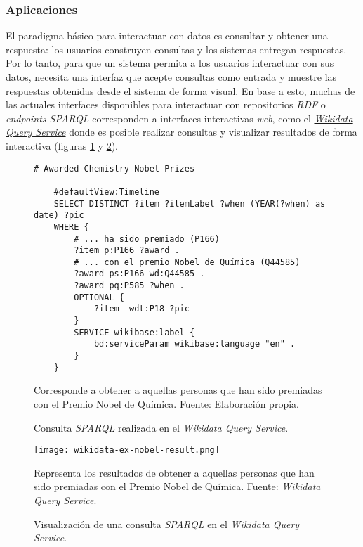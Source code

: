 \subsubsection{Aplicaciones}
\label{sec:aplicaciones}

El paradigma básico para interactuar con datos es consultar y obtener una respuesta: los usuarios construyen consultas y los sistemas entregan respuestas. Por lo tanto, para que un sistema permita a los usuarios interactuar con sus datos, necesita una interfaz que acepte consultas como entrada y muestre las respuestas obtenidas desde el sistema de forma visual. En base a esto, muchas de las actuales interfaces disponibles para interactuar con repositorios \textit{RDF} o \textit{endpoints SPARQL} corresponden a interfaces interactivas \textit{web}, como el \href{https://query.wikidata.org}{\textit{Wikidata Query Service}} donde es posible realizar consultas y visualizar resultados de forma interactiva (figuras \ref{fig:wikidata-ex-nobel} y \ref{fig:wikidata-ex-nobel-result}).

\begin{figure}
    \begin{lstlisting}[language=SPARQL]
    # Awarded Chemistry Nobel Prizes

    #defaultView:Timeline
    SELECT DISTINCT ?item ?itemLabel ?when (YEAR(?when) as date) ?pic
    WHERE {
        # ... ha sido premiado (P166)
        ?item p:P166 ?award .
        # ... con el premio Nobel de Química (Q44585)
        ?award ps:P166 wd:Q44585 .
        ?award pq:P585 ?when .
        OPTIONAL {
            ?item  wdt:P18 ?pic
        }
        SERVICE wikibase:label {
            bd:serviceParam wikibase:language "en" .
        }
    }
    \end{lstlisting}
    \caption{Consulta \textit{SPARQL} realizada en el \textit{Wikidata Query
    Service}.} Corresponde a obtener a aquellas personas que han sido premiadas
    con el Premio Nobel de Química. Fuente: Elaboración propia.
    \label{fig:wikidata-ex-nobel}
\end{figure}

\begin{figure}
    \centering
    \texttt{[image: wikidata-ex-nobel-result.png]}
    \caption{Visualización de una consulta \textit{SPARQL} en el
    \textit{Wikidata Query Service}.} Representa los resultados de obtener a
    aquellas personas que han sido premiadas con el Premio Nobel de Química.
    Fuente: \textit{Wikidata Query Service}.
    \label{fig:wikidata-ex-nobel-result}
\end{figure}

